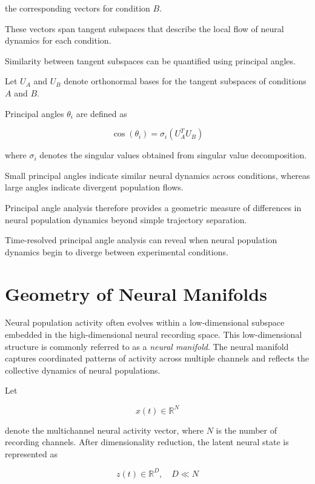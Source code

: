 \documentclass[11pt]{report}
\begin{document}
the corresponding vectors for condition $B$.

These vectors span tangent subspaces that describe the local flow of
neural dynamics for each condition.

Similarity between tangent subspaces can be quantified using
principal angles.

Let $U_A$ and $U_B$ denote orthonormal bases for the tangent
subspaces of conditions $A$ and $B$.

Principal angles $\theta_i$ are defined as

\begin{equation}
\cos(\theta_i) =
\sigma_i(U_A^T U_B)
\end{equation}

where $\sigma_i$ denotes the singular values obtained from
singular value decomposition.

Small principal angles indicate similar neural dynamics across
conditions, whereas large angles indicate divergent population
flows.

Principal angle analysis therefore provides a geometric measure
of differences in neural population dynamics beyond simple
trajectory separation.

Time-resolved principal angle analysis can reveal when neural
population dynamics begin to diverge between experimental
conditions.

\chapter{Geometry of Neural Manifolds}

Neural population activity often evolves within a low-dimensional
subspace embedded in the high-dimensional neural recording space.
This low-dimensional structure is commonly referred to as a
\textit{neural manifold}. The neural manifold captures coordinated
patterns of activity across multiple channels and reflects the
collective dynamics of neural populations.

Let

\begin{equation}
x(t) \in \mathbb{R}^{N}
\end{equation}

denote the multichannel neural activity vector, where $N$ is the
number of recording channels. After dimensionality reduction, the
latent neural state is represented as

\begin{equation}
z(t) \in \mathbb{R}^{D}, \quad D \ll N
\end{equation}
\end{document}
